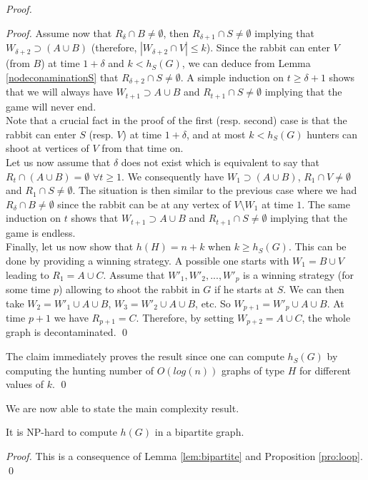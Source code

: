 \documentclass[runningheads]{llncs}
\begin{document}
\begin{proof}
\begin{proof}
Assume now that $R_{\delta} \cap B \neq \emptyset$, then $R_{\delta + 1} \cap S \neq \emptyset$ implying that $W_{\delta + 2} \supset (A \cup B) $ (therefore,  $|W_{\delta + 2} \cap V| \leq k$). Since the rabbit {can enter} $V$ (from $B$) at time $1 + \delta$ and $k <h_S(G)$, we can deduce from Lemma \ref{nodeconaminationS} that $R_{\delta + 2} \cap S \neq \emptyset$.
{A simple} 
 induction on $t \geq \delta + 1$ {shows that we will always  have $W_{t+1} \supset A \cup B$ and $R_{t+1} \cap S \neq \emptyset$ implying that} the game will never end. \\
 {Note that a crucial fact in the proof of the first (resp. second) case is that the rabbit {can enter} $S$ (resp. $V$) at time $1+\delta$, and at most $k <h_S(G)$ hunters can {shoot at vertices of} $V$ from that time on.\\} Let us now assume that $\delta $ does not exist which is equivalent to say that $R_t \cap (A \cup B) = \emptyset$ $\forall t \geq 1$. We consequently have $W_1 \supset (A \cup B)$, $R_1 \cap V \neq \emptyset$ and $R_1 \cap {S \neq \emptyset}$. %
 The situation is then similar to the previous case where we had $R_{\delta} \cap B \neq \emptyset$ since the rabbit can be at any vertex of $V {\setminus W_1}$ at time $1$. The same induction on $t$ shows that $W_{t+1} \supset A \cup B$ and $R_{t+1} \cap S \neq \emptyset$ implying that the game is endless. \\
Finally, let us now show that $h(H) = n+k$ when $k \geq h_S(G)$. This  can be done by providing a winning strategy. A possible one starts with $W_1 = B \cup V$ leading to $R_1 = A \cup C$.  Assume that $W'_1, W'_2,..., W'_p$ is a winning strategy (for some time $p$) allowing to {shoot} the rabbit in $G$ if he starts at $S$. We can then take $W_2 = W'_1 \cup A \cup B$, $W_3 = W'_2 \cup A \cup B$, etc. So $W_{p+1} =W'_p \cup A \cup B$. At time $p+1$ we have $R_{p+1} = C$. Therefore, by setting   $W_{p+2} = A  \cup C$, the whole graph is decontaminated. 
\qed\end{proof}
The claim immediately proves the result since one can compute $h_S(G)$ by  computing the {hunting number} of $O(log(n))$ graphs of type $H$ for different values of $k$. 
\qed\end{proof}

We are now able to state the main complexity result. 

\begin{theorem}
It is NP-hard to compute $h(G)$ in a  bipartite graph.
\label{th:main}
\end{theorem}
\begin{proof}
This is a consequence of Lemma \ref{lem:bipartite} and Proposition  \ref{pro:loop}.
\qed\end{proof}
\end{document}
